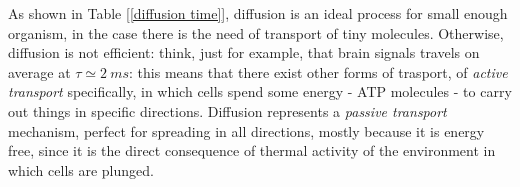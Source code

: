 \documentclass[../main/main.tex]{subfiles}
\begin{document}
\begin{table}[h!]
    \centering
    \caption{\label{diffusion time} Diffusion time.}
\end{table}

As shown in Table [\ref{diffusion time}], diffusion is an ideal process for small enough organism, in the case there is the need of transport of tiny molecules. Otherwise, diffusion is not efficient: think, just for example, that brain signals travels on average at $\tau\simeq2\:ms$: this means that there exist other forms of trasport, of \emph{active transport} specifically, in which cells spend some energy - ATP molecules - to carry out things in specific directions. Diffusion represents a \emph{passive transport} mechanism, perfect for spreading in all directions, mostly because it is energy free, since it is the direct consequence of thermal activity of the environment in which cells are plunged.
\end{document}
